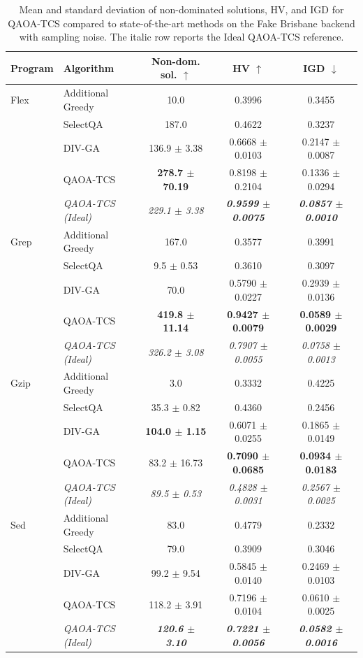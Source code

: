 \begin{table}[ht]
\centering
\scriptsize
\setlength{\tabcolsep}{3pt}
\caption{Mean and standard deviation of non-dominated solutions, HV, and IGD for QAOA-TCS compared to state-of-the-art methods on the Fake Brisbane backend with sampling noise. The italic row reports the Ideal QAOA-TCS reference.}
\label{tab:fakebris_means}
\begin{tabular}{llccc}
\toprule
\textbf{Program} & \textbf{Algorithm} & \textbf{Non-dom. sol.} $\uparrow$ & \textbf{HV} $\uparrow$ & \textbf{IGD} $\downarrow$ \\
\midrule
Flex & Additional Greedy & 10.0 & 0.3996 & 0.3455 \\
 & SelectQA & 187.0 & 0.4622 & 0.3237 \\
 & DIV-GA & 136.9 $\pm$ 3.38 & 0.6668 $\pm$ 0.0103 & 0.2147 $\pm$ 0.0087 \\
 & QAOA-TCS & \textbf{278.7 $\pm$ 70.19} & 0.8198 $\pm$ 0.2104 & 0.1336 $\pm$ 0.0294 \\
 & \textit{QAOA-TCS (Ideal)} & \textit{229.1 $\pm$ 3.38} & \textbf{\textit{0.9599 $\pm$ 0.0075}} & \textbf{\textit{0.0857 $\pm$ 0.0010}} \\
\midrule
Grep & Additional Greedy & 167.0 & 0.3577 & 0.3991 \\
 & SelectQA & 9.5 $\pm$ 0.53 & 0.3610 & 0.3097 \\
 & DIV-GA & 70.0 & 0.5790 $\pm$ 0.0227 & 0.2939 $\pm$ 0.0136 \\
 & QAOA-TCS & \textbf{419.8 $\pm$ 11.14} & \textbf{0.9427 $\pm$ 0.0079} & \textbf{0.0589 $\pm$ 0.0029} \\
 & \textit{QAOA-TCS (Ideal)} & \textit{326.2 $\pm$ 3.08} & \textit{0.7907 $\pm$ 0.0055} & \textit{0.0758 $\pm$ 0.0013} \\
\midrule
Gzip & Additional Greedy & 3.0 & 0.3332 & 0.4225 \\
 & SelectQA & 35.3 $\pm$ 0.82 & 0.4360 & 0.2456 \\
 & DIV-GA & \textbf{104.0 $\pm$ 1.15} & 0.6071 $\pm$ 0.0255 & 0.1865 $\pm$ 0.0149 \\
 & QAOA-TCS & 83.2 $\pm$ 16.73 & \textbf{0.7090 $\pm$ 0.0685} & \textbf{0.0934 $\pm$ 0.0183} \\
 & \textit{QAOA-TCS (Ideal)} & \textit{89.5 $\pm$ 0.53} & \textit{0.4828 $\pm$ 0.0031} & \textit{0.2567 $\pm$ 0.0025} \\
\midrule
Sed & Additional Greedy & 83.0 & 0.4779 & 0.2332 \\
 & SelectQA & 79.0 & 0.3909 & 0.3046 \\
 & DIV-GA & 99.2 $\pm$ 9.54 & 0.5845 $\pm$ 0.0140 & 0.2469 $\pm$ 0.0103 \\
 & QAOA-TCS & 118.2 $\pm$ 3.91 & 0.7196 $\pm$ 0.0104 & 0.0610 $\pm$ 0.0025 \\
 & \textit{QAOA-TCS (Ideal)} & \textbf{\textit{120.6 $\pm$ 3.10}} & \textbf{\textit{0.7221 $\pm$ 0.0056}} & \textbf{\textit{0.0582 $\pm$ 0.0016}} \\
\bottomrule
\end{tabular}%
\end{table}

